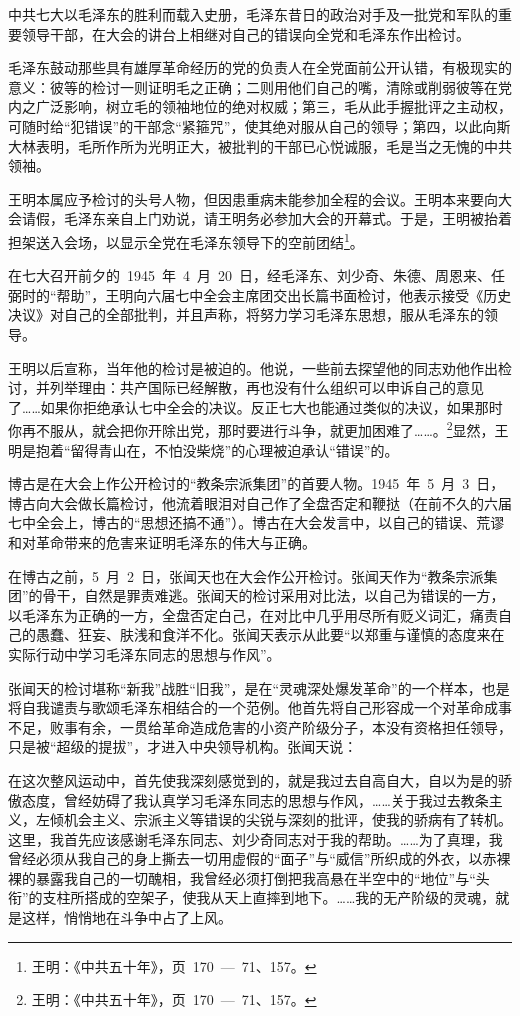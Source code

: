 中共七大以毛泽东的胜利而载入史册，毛泽东昔日的政治对手及一批党和军队的重要领导干部，在大会的讲台上相继对自己的错误向全党和毛泽东作出检讨。

毛泽东鼓动那些具有雄厚革命经历的党的负责人在全党面前公开认错，有极现实的意义：彼等的检讨一则证明毛之正确；二则用他们自己的嘴，清除或削弱彼等在党内之广泛影响，树立毛的领袖地位的绝对权威；第三，毛从此手握批评之主动权，可随时给“犯错误”的干部念“紧箍咒”，使其绝对服从自己的领导；第四，以此向斯大林表明，毛所作所为光明正大，被批判的干部已心悦诚服，毛是当之无愧的中共领袖。

王明本属应予检讨的头号人物，但因患重病未能参加全程的会议。王明本来要向大会请假，毛泽东亲自上门劝说，请王明务必参加大会的开幕式。于是，王明被抬着担架送入会场，以显示全党在毛泽东领导下的空前团结\footnote{王明：《中共五十年》，页~170~—~71、157。}。

在七大召开前夕的~1945~年~4~月~20~日，经毛泽东、刘少奇、朱德、周恩来、任弼时的“帮助”，王明向六届七中全会主席团交出长篇书面检讨，他表示接受《历史决议》对自己的全部批判，并且声称，将努力学习毛泽东思想，服从毛泽东的领导。

王明以后宣称，当年他的检讨是被迫的。他说，一些前去探望他的同志劝他作出检讨，并列举理由：共产国际已经解散，再也没有什么组织可以申诉自己的意见了……如果你拒绝承认七中全会的决议。反正七大也能通过类似的决议，如果那时你再不服从，就会把你开除出党，那时要进行斗争，就更加困难了……。\footnote{王明：《中共五十年》，页~170~—~71、157。}显然，王明是抱着“留得青山在，不怕没柴烧”的心理被迫承认“错误”的。

博古是在大会上作公开检讨的“教条宗派集团”的首要人物。1945~年~5~月~3~日，博古向大会做长篇检讨，他流着眼泪对自己作了全盘否定和鞭挞（在前不久的六届七中全会上，博古的“思想还搞不通”）。博古在大会发言中，以自己的错误、荒谬和对革命带来的危害来证明毛泽东的伟大与正确。

在博古之前，5~月~2~日，张闻天也在大会作公开检讨。张闻天作为“教条宗派集团”的骨干，自然是罪责难逃。张闻天的检讨采用对比法，以自己为错误的一方，以毛泽东为正确的一方，全盘否定白己，在对比中几乎用尽所有贬义词汇，痛责自己的愚蠢、狂妄、肤浅和食洋不化。张闻天表示从此要“以郑重与谨慎的态度来在实际行动中学习毛泽东同志的思想与作风”。

张闻天的检讨堪称“新我”战胜“旧我”，是在“灵魂深处爆发革命”的一个样本，也是将自我谴责与歌颂毛泽东相结合的一个范例。他首先将自己形容成一个对革命成事不足，败事有余，一贯给革命造成危害的小资产阶级分子，本没有资格担任领导，只是被“超级的提拔”，才进入中央领导机构。张闻天说：

\begin{quoting}
在这次整风运动中，首先使我深刻感觉到的，就是我过去自高自大，自以为是的骄傲态度，曾经妨碍了我认真学习毛泽东同志的思想与作风，……关于我过去教条主义，左倾机会主义、宗派主义等错误的尖锐与深刻的批评，使我的骄病有了转机。这里，我首先应该感谢毛泽东同志、刘少奇同志对于我的帮助。……为了真理，我曾经必须从我自己的身上撕去一切用虚假的“面子”与“威信”所织成的外衣，以赤裸裸的暴露我自己的一切醜相，我曾经必须打倒把我高悬在半空中的“地位”与“头衔”的支柱所搭成的空架子，使我从天上直摔到地下。……我的无产阶级的灵魂，就是这样，悄悄地在斗争中占了上风。
\end{quoting}

